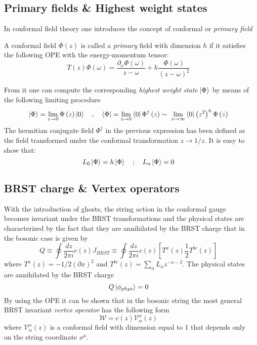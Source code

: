 \subsection{Primary fields \& Highest weight states}
In conformal field theory one introduces the concept of conformal or
\textit{primary field} 
\begin{definition}
  A conformal field $\Phi(z)$ is called a \textit{primary} field with dimension
  $h$ if it satisfies the following OPE with the energy-momentum tensor:
\begin{equation}
	T\left(z\right)\Phi\left(\omega\right) = \frac{\partial_\omega\Phi\left(\omega\right)}{z-\omega} + h\frac{\Phi\left(\omega\right)}{\left(z-\omega\right)^2}
\end{equation}
\end{definition}
From it one can compute the corresponding \textit{highest weight state} $\ket{\Phi}$ by means of the following limiting procedure
\begin{equation}
\ket{\Phi} = \lim_{z\rightarrow 0}\Phi\left(z\right)\ket{0}\quad,\quad\bra{\Phi} = \lim_{z\rightarrow 0}\bra{0}\Phi^{\dagger}\left(z\right)\sim\ \lim_{z\rightarrow \infty}\bra{0}\left(z^2\right)^h\Phi\left(z\right)
\end{equation}
The hermitian conjugate field $\Phi^{\dagger}$ in the previous expression has been defined as the field transformed under the conformal transformation $z\rightarrow 1/z$. It is easy to show that:
\begin{equation}
	L_0\ket{\Phi} = h\ket{\Phi}\quad;\quad L_n\ket{\Phi} = 0
\end{equation}
\subsection{BRST charge \& Vertex operators}
\par With the introduction of ghosts, the string action in the conformal gauge becomes invariant under the BRST transformations and the physical states are characterized by the fact that they are annihilated by the BRST charge that in the bosonic case is given by
\begin{equation}
	Q\equiv \oint{\frac{dz}{2\pi i }c\left(z\right)J_{BRST}} \equiv \oint{\frac{dz}{2\pi i }c\left(z\right)\left[T^x\left(z\right)  \frac{1}{2}T^{bc}\left(z\right)\right]}
\end{equation}
where $T^x\left(z\right)= -1/2\left(\partial x\right)^2$ and $T^{bc}\left(z\right) = \sum_n{L_n z^{-n-2}}$. The physical states are annihilated by the BRST charge
\begin{equation}
	Q\ket{\phi_{phys}} = 0
\end{equation}
By using the OPE it can be shown that in the bosonic string the most general BRST invariant \textit{vertex operator} has the following form
\begin{equation}
	\mathcal{W}= c\left(z\right)\mathcal{V}_\alpha^x\left(z\right)
\end{equation}
where $\mathcal{V}_\alpha^x\left(z\right)$ is a conformal field with dimension
equal to 1 that depends only on the string coordinate $x^\mu$.

